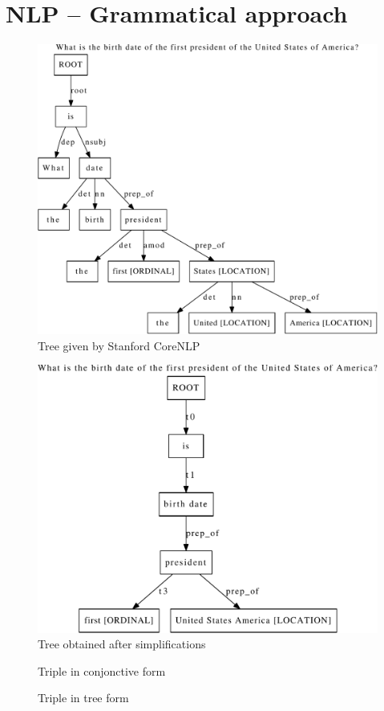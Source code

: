 \documentclass[a4paper,10pt]{report}
\begin{document}
\chapter{NLP \--- Grammatical approach}
\begin{figure}
\caption{Tree given by Stanford CoreNLP}
\label{tree_before}
\includegraphics[scale=0.6]{../examples_NLP_classical/before_simplification.pdf}
\end{figure}

\begin{figure}
\caption{Tree obtained after simplifications}
\label{tree_after}
\includegraphics[scale=0.6]{../examples_NLP_classical/after_simplification.pdf}
\end{figure}


\begin{figure}
\caption{Triple in conjonctive form}
\label{triple_conj}

\end{figure}

\begin{figure}
\caption{Triple in tree form}
\label{triple_tree}

\end{figure}



\nocite{*}
\end{document}
